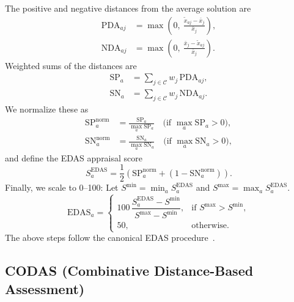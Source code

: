 \documentclass[conference]{IEEEtran}
\begin{document}
The positive and negative distances from the average solution are
\begin{align}
\mathrm{PDA}_{a j} &= \max\!\left(0,\ \frac{\tilde x_{a j} - \bar x_j}{\bar x_j}\right),\\
\mathrm{NDA}_{a j} &= \max\!\left(0,\ \frac{\bar x_j - \tilde x_{a j}}{\bar x_j}\right).
\end{align}
Weighted sums of the distances are
\begin{align}
\mathrm{SP}_a &= \sum_{j \in \mathcal{C}} w_j\,\mathrm{PDA}_{a j},\\
\mathrm{SN}_a &= \sum_{j \in \mathcal{C}} w_j\,\mathrm{NDA}_{a j}.
\end{align}
We normalize these as
\begin{align}
\mathrm{SP}^{\text{norm}}_a &= \frac{\mathrm{SP}_a}{\max_a \mathrm{SP}_a} \quad\text{(if }\max_a \mathrm{SP}_a > 0\text{)},\\
\mathrm{SN}^{\text{norm}}_a &= \frac{\mathrm{SN}_a}{\max_a \mathrm{SN}_a} \quad\text{(if }\max_a \mathrm{SN}_a > 0\text{)},
\end{align}
and define the EDAS appraisal score
\begin{equation}
S^{\text{EDAS}}_a = \frac{1}{2}\left(\mathrm{SP}^{\text{norm}}_a + \left(1 - \mathrm{SN}^{\text{norm}}_a\right)\right).
\end{equation}
Finally, we scale to 0--100:
Let
$S^{\min} = \min_a S^{\mathrm{EDAS}}_a$
and
$S^{\max} = \max_a S^{\mathrm{EDAS}}_a$.
\begin{equation}
\mathrm{EDAS}_a =
\begin{cases}
\displaystyle
100\,\dfrac{S^{\mathrm{EDAS}}_a - S^{\min}}{S^{\max} - S^{\min}},
& \text{if } S^{\max} > S^{\min},\\[0.6em]
50, & \text{otherwise.}
\end{cases}
\end{equation}
The above steps follow the canonical EDAS procedure~\cite{EDAS}.

\subsection{CODAS (Combinative Distance-Based Assessment)}
\end{document}
